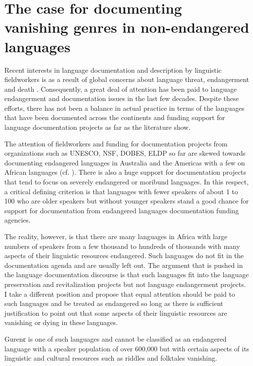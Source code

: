 \documentclass[output=paper,colorlinks,citecolor=brown]{langscibook}
\begin{document}
\section{The case for documenting vanishing genres in non-endangered languages}\label{sec:atintono:3}
Recent interests in language documentation and description by linguistic fieldworkers is as a result of global concerns about language threat, endangerment and death \citep{HaleEtAl1992, Himmelmann1998, HimmelmannEtAl2006, GrenobleWhaley1996, Crystal2000, Crystal2003, Woodbury2003, Austin2003, Austin2006, GippertEtAl2006, Bowern2015, ChelliahWillem2010, EssegbeyEtAl2015}. Consequently, a great deal of attention has been paid to language endangerment and documentation issues in the last few decades. Despite these efforts, there has not been a balance in actual practice in terms of the languages that have been documented across the continents and funding support for language documentation projects as far as the literature show. 

The attention of fieldworkers and funding for documentation projects from organizations such as UNESCO, NSF, DOBES, ELDP so far are skewed towards documenting endangered languages in Australia and the Americas with a few on African languages (cf. \citealt{EssegbeyEtAl2015}).  There is also a huge support for documentation projects that tend to focus on severely endangered or moribund languages. In this respect, a critical defining criterion is that languages with fewer speakers of about 1 to 100 who are older speakers but without younger speakers stand a good chance for support for documentation from endangered languages documentation funding agencies. 

The reality, however, is that there are many languages in Africa with large numbers of speakers from a few thousand to hundreds of thousands with many aspects of their linguistic resources endangered. Such languages do not fit in the documentation agenda and are usually left out. The argument that is pushed in the language documentation discourse is that such languages fit into the language preservation and revitalization projects but not language endangerment projects. I take a different position and propose that equal attention should be paid to such languages and be treated as endangered so long as there is sufficient justification to point out that some aspects of their linguistic resources are vanishing or dying in these languages. 

Gurenɛ is one of such languages and cannot be classified as an endangered language with a speaker population of over 600,000 but with certain aspects of its linguistic and cultural resources such as riddles and folktales vanishing. 
\end{document}
